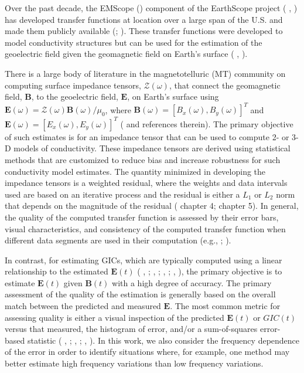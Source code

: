\documentclass[linenumbers,draft]{agujournal}
\newcommand{\citeay}[1]{%
\citeauthor{#1}, \citeyear{#1}%
}
\begin{document}
Over the past decade, the EMScope (\cite{Schultz2009}) component of the EarthScope project (\citeay{Meltzer2003}) has developed transfer functions at location over a large span of the U.S. and made them publicly available (\cite{Kelbert2011}; \cite{Schultz2016}).  These transfer functions were developed to model conductivity structures but can be used for the estimation of the geoelectric field given the geomagnetic field on Earth's surface (\citeay{Bedrosian2015}).

There is a large body of literature in the magnetotelluric (MT) community on computing surface impedance tensors, $\mathcal{Z}(\omega)$, that connect the geomagnetic field, $\mathbf{B}$, to the geoelectric field, $\mathbf{E}$, on Earth's surface using $\mathbf{E}(\omega) = \mathcal{Z}(\omega)\mathbf{B}(\omega)/\mu_0$, where $\mathbf{B}(\omega) = [B_x(\omega),B_y(\omega)]^T$ and $\mathbf{E}(\omega) = [E_x(\omega),E_y(\omega)]^T$ (\cite{Chave2012} and references therein).  The primary objective of such estimates is for an impedance tensor that can be used to compute 2- or 3-D models of conductivity. These impedance tensors are derived using statistical methods that are customized to reduce bias and increase robustness for such conductivity model estimates.  The quantity minimized in developing the impedance tensors is a weighted residual, where the weights and data intervals used are based on an iterative process and the residual is either a $L_1$ or $L_2$ norm that depends on the magnitude of the residual (\cite{Simpson2005} chapter 4; \cite{Chave2012} chapter 5).  In general, the quality of the computed transfer function is assessed by their error bars, visual characteristics, and consistency of the computed transfer function when different data segments are used in their computation (e.g., \cite{Jones1989}; \cite{Fujii2015}).

In contrast, for estimating GICs, which are typically computed using a linear relationship to the estimated $\mathbf{E}(t)$ (\citeay{Lehtinen1985}; \citeay{Pulkkinen2010}; \citeay{Viljanen2012}; \citeay{NERC2015}), the primary objective is to estimate $\mathbf{E}(t)$ given $\mathbf{B}(t)$ with a high degree of accuracy.  The primary assessment of the quality of the estimation is generally based on the overall match between the predicted and measured $\mathbf{E}$.  The most common metric for assessing quality is either a visual inspection of the predicted $\mathbf{E}(t)$ or $GIC(t)$ versus that measured, the histogram of error, and/or a sum-of-squares error-based statistic  (\citeay{McKay2003}; \citeay{Pulkkinen2010}; \citeay{Love2014}).  In this work, we also consider the frequency dependence of the error in order to identify situations where, for example, one method may better estimate high frequency variations than low frequency variations.
\end{document}
